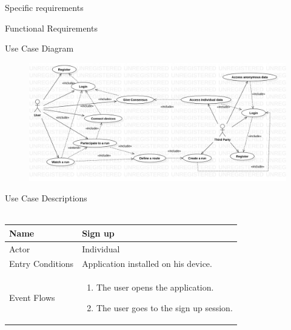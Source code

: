 \documentclass{article}
\begin{document}
\begin{legal}
	\item {Specific requirements}
  		\begin{legal}\bfseries
    		\item Functional Requirements
    		\begin{legal}\bfseries
    			\item Use Case Diagram
    			\begin{figure}[H]
			  	\includegraphics[width=\linewidth]{usecase.jpg}
				\end{figure}
				\item Use Case Descriptions\\\\
				\begin{tabular}{| m{3.5cm} | m{8cm}| }
				\hline
					Name & Sign up\\
				\hline
					Actor & Individual\\
				\hline
					Entry Conditions & Application installed
				on his device.\\
				\hline
					Event Flows & \begin{enumerate}
									\item The user opens the application.
									\item The user goes to the sign up session.
									

\end{enumerate}
\end{tabular}
\end{legal}
\end{legal}
\end{legal}
\end{document}
